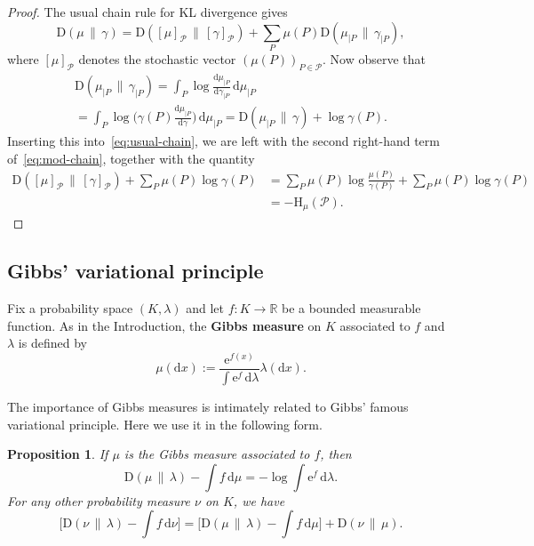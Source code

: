 \documentclass[aop,preprint]{imsart}
\newtheorem{prop}[thm]{Proposition}
\theoremstyle{remark}
\newcommand{\bbR}{\mathbb{R}}
\newcommand{\rmH}{\mathrm{H}}
\renewcommand{\d}{\mathrm{d}}
\newcommand{\rme}{\mathrm{e}}
\renewcommand{\P}{\mathcal{P}}
\newcommand{\g}{\gamma}
\renewcommand{\l}{\lambda}
\renewcommand{\to}{\longrightarrow}
\newcommand{\rmD}{\mathrm{D}}
\begin{document}
\begin{proof}
	The usual chain rule for KL divergence gives
	\begin{equation}\label{eq:usual-chain}
	\rmD(\mu\,\|\,\g) = \rmD([\mu]_\P\,\|\,[\g]_\P) + \sum_P\mu(P)\rmD(\mu_{|P}\,\|\,\g_{|P}),
	\end{equation}
	where $[\mu]_\P$ denotes the stochastic vector $(\mu(P))_{P\in\P}$. Now observe that
	\begin{multline*}
		\rmD(\mu_{|P}\,\|\,\g_{|P}) = \int_P \log\frac{\d\mu_{|P}}{\d\g_{|P}}\,\d\mu_{|P} \\= \int_P \log \Big(\g(P)\frac{\d\mu_{|P}}{\d\g}\Big)\,\d\mu_{|P} = \rmD(\mu_{|P}\,\|\,\g) + \log \g(P).
	\end{multline*}
	Inserting this into~\eqref{eq:usual-chain}, we are left with the second right-hand term of~\eqref{eq:mod-chain}, together with the quantity
	\begin{align*}
		\rmD([\mu]_\P\,\|\,[\g]_\P) + \sum_P\mu(P) \log\g(P) &= \sum_P\mu(P)\log\frac{\mu(P)}{\g(P)} + \sum_P\mu(P) \log\g(P) \\
		&= - \rmH_\mu(\P).
	\end{align*}
\end{proof}


\subsection{Gibbs' variational principle}\label{subs:Gibbs}

Fix a probability space $(K,\l)$ and let $f:K\to \bbR$ be a bounded measurable function.  As in the Introduction, the \textbf{Gibbs measure} on $K$ associated to $f$ and $\l$ is defined by
\begin{equation}\label{eq:Gibbs}
\mu(\d x) := \frac{\rme^{f(x)}}{\int \rme^f\,\d\l}\l(\d x).
\end{equation}

The importance of Gibbs measures is intimately related to Gibbs' famous variational principle.  Here we use it in the following form.

\begin{prop}\label{prop:Gibbs-with-error}
If $\mu$ is the Gibbs measure associated to $f$, then
\[\rmD(\mu\,\|\,\l) - \int f\,\d\mu = -\log \int \rme^f\,\d\l.\]
	For any other probability measure $\nu$ on $K$, we have
\begin{equation}\label{eq:Gibbs-with-error}
\Big[\rmD(\nu\,\|\,\l) - \int f\,\d\nu\Big] = \Big[\rmD(\mu\,\|\,\l) - \int f\,\d\mu\Big] + \rmD(\nu\,\|\,\mu).
\end{equation}
	\end{prop}
\end{document}
